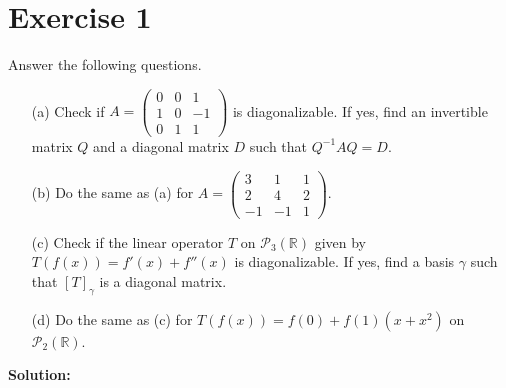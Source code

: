 \documentclass{article}
\begin{document}
\section*{Exercise 1}
Answer the following questions.

\begin{itemize}
    \item[(a)] Check if $A = \begin{pmatrix} 0 & 0 & 1 \\ 1 & 0 & -1 \\ 0 & 1 & 1 \end{pmatrix}$ is diagonalizable. If yes, find an invertible matrix $Q$ and a diagonal matrix $D$ such that $Q^{-1}AQ = D$.
    \item[(b)] Do the same as (a) for $A = \begin{pmatrix} 3 & 1 & 1 \\ 2 & 4 & 2 \\ -1 & -1 & 1 \end{pmatrix}$.
    \item[(c)] Check if the linear operator $T$ on $\mathcal{P}_3(\mathbb{R})$ given by $T(f(x)) = f'(x) + f''(x)$ is diagonalizable. If yes, find a basis $\gamma$ such that $[T]_{\gamma}$ is a diagonal matrix.
    \item[(d)] Do the same as (c) for $T(f(x)) = f(0) + f(1)(x + x^2)$ on $\mathcal{P}_2(\mathbb{R})$.
\end{itemize}

\textbf{Solution:} \\
\end{document}
